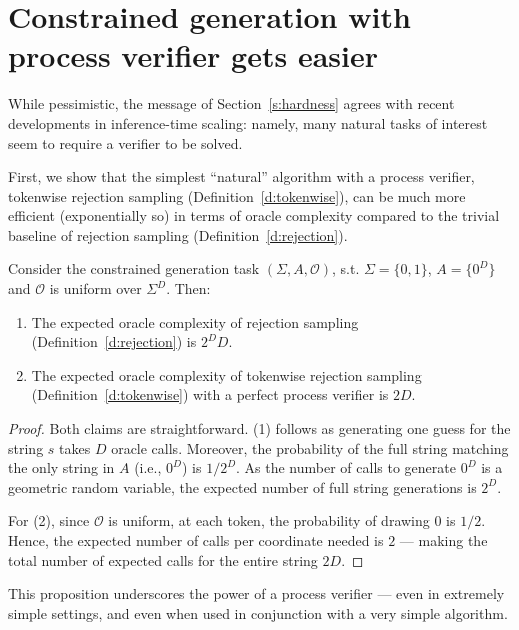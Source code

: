 \section{Constrained generation with process verifier gets easier}
\label{s:plusverifier}

While pessimistic, the message of Section~\ref{s:hardness} agrees with recent developments in inference-time scaling: namely, many natural tasks of interest seem to require a verifier to be solved. 

First, we show that the simplest ``natural'' algorithm with a process verifier, tokenwise rejection sampling (Definition~\ref{d:tokenwise}), can be much more efficient (exponentially so) in terms of oracle complexity compared to the trivial baseline of rejection sampling (Definition~\ref{d:rejection}). 

\begin{proposition} 
\label{prop:easy_with_verifier}
Consider the constrained generation task $(\Sigma, A, \mathcal{O})$, s.t. $\Sigma = \{0,1\}$, $A = \{0^D\}$ and $\mathcal{O}$ is uniform over $\Sigma^D$. Then: 
\begin{enumerate}
    \item The expected oracle complexity of rejection sampling (Definition~\ref{d:rejection}) is $2^D D$.  
    \item The expected oracle complexity of tokenwise rejection sampling (Definition~\ref{d:tokenwise}) with a perfect process verifier is $2 D$.  
\end{enumerate}
\end{proposition}
\begin{proof}
Both claims are straightforward. (1) follows as generating one guess for the string $s$ takes $D$ oracle calls. Moreover, the probability of the full string matching the only string in $A$ (i.e., $0^D$) is $1/2^D$. As the number of calls to generate $0^D$ is a geometric random variable, the expected number of full string generations is $2^D$. 

For (2), since $\mathcal{O}$ is uniform, at each token, the probability of drawing $0$ is $1/2$. Hence, the expected number of calls per coordinate needed is $2$ --- making the total number of expected calls for the entire string $2D$. 
\end{proof}

This proposition underscores the power of a process verifier --- even in extremely simple settings, and even when used in conjunction with a very simple algorithm. 

